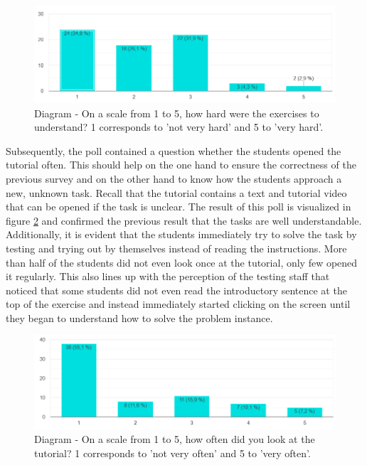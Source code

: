 \begin{figure}[H]
    \centering
    \includegraphics[width=1 \columnwidth]{figures/f1.png}
    \caption{Diagram - On a scale from 1 to 5, how hard were the exercises to understand? 1 corresponds to 'not very hard' and 5 to 'very hard'.} 
    \label{fig:f1} 
\end{figure}

Subsequently, the poll contained a question whether the students opened the tutorial often. This should  help on the one hand to ensure the correctness of the previous survey and on the other hand to know how the students approach a new, unknown task. Recall that the tutorial contains a text and tutorial video that can be opened if the task is unclear. The result of this poll is visualized in figure \ref{fig:f2} and confirmed the previous result that the tasks are well understandable. Additionally, it is evident that the students immediately try to solve the task by testing and trying out by themselves instead of reading the instructions. More than half of the students did not even look once at the tutorial, only few opened it regularly. This also lines up with the perception of the testing staff that noticed that some students did not even read the introductory sentence at the top of the exercise and instead immediately started clicking on the screen until they began to understand how to solve the problem instance.


\begin{figure}[H]
    \centering
    \includegraphics[width=1 \columnwidth]{figures/f2.png}
    \caption{Diagram - On a scale from 1 to 5, how often did you look at the tutorial? 1 corresponds to 'not very often' and 5 to 'very often'.} 
    \label{fig:f2} 
\end{figure}


